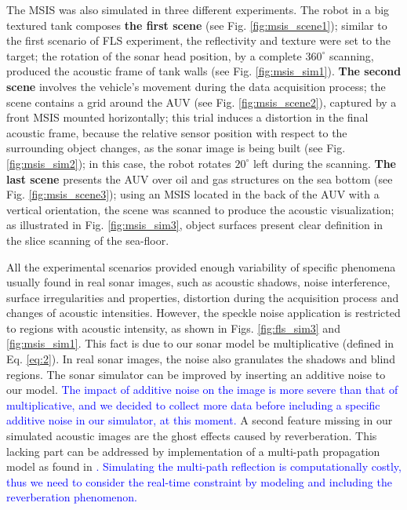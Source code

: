 \documentclass[final,5p,times]{elsarticle}
\begin{document}
The MSIS was also simulated in three different experiments. The robot in a
big textured tank composes \textbf{the first scene} (see Fig.
\ref{fig:msis_scene1}); similar to the first scenario of FLS experiment,
the reflectivity and texture were set to the target; the rotation of the
sonar head position, by a complete $360^{\circ}$ scanning, produced the acoustic
frame of tank walls (see Fig. \ref{fig:msis_sim1}). \textbf{The second scene}
involves the vehicle's movement during the data acquisition process; the scene
contains a grid around the AUV (see Fig. \ref{fig:msis_scene2}), captured by a front MSIS mounted horizontally; this trial induces a distortion in the final
acoustic frame, because the relative sensor position with respect to the
surrounding object changes, as the sonar image is being built (see
Fig. \ref{fig:msis_sim2}); in this case, the robot rotates $20^{\circ}$ left
during the scanning. \textbf{The last scene} presents the AUV over oil
and gas structures on the sea bottom (see Fig. \ref{fig:msis_scene3});
using an MSIS located in the back of the AUV with a vertical orientation, the scene was scanned to produce the acoustic visualization; as illustrated in Fig. \ref{fig:msis_sim3}, object surfaces present clear definition in the slice scanning of the sea-floor.

All the experimental scenarios provided enough variability of specific phenomena usually found in real sonar images, such as acoustic shadows, noise interference, surface irregularities and properties, distortion during the acquisition process and changes of acoustic intensities. However, the speckle noise application is restricted to regions with acoustic intensity, as shown in Figs. \ref{fig:fls_sim3} and \ref{fig:msis_sim1}. This fact is due to our sonar model be multiplicative (defined in Eq. \ref{eq:2}). In real sonar images, the noise also granulates the shadows and blind regions. The sonar simulator can be improved by inserting an additive noise to our model.
\textcolor{blue}{The impact of additive noise on the image is more severe than that of multiplicative, and we decided to collect more data before including a specific additive noise in our simulator, at this moment.} A second feature missing in our simulated acoustic images are the ghost effects caused by reverberation. This lacking part can be addressed by implementation of a multi-path propagation model as found in \textcolor{blue}{\cite{huang2015b}. Simulating the multi-path reflection is computationally costly, thus we need to consider the real-time constraint by modeling and including the reverberation phenomenon.}
\end{document}
